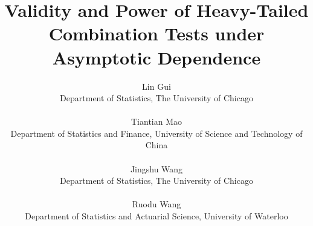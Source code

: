 \documentclass[12pt]{article}
\theoremstyle{plain}
\theoremstyle{plain}
\theoremstyle{definition}
\begin{document}
\def\spacingset#1{\renewcommand{\baselinestretch}%
{#1}\small\normalsize} \spacingset{1}


\title{\bf Validity and Power of Heavy-Tailed Combination Tests under Asymptotic Dependence}
\author{Lin Gui\vspace{-0.35cm}\\
    Department of Statistics, The University of Chicago \hspace{.2cm}\\
  \hspace{.2cm}\\ 
    Tiantian Mao\hspace{.2cm}\\
    Department of Statistics and Finance, University of Science and Technology of China \hspace{.2cm}\\
    \hspace{.2cm}\\ 
    Jingshu Wang\hspace{.2cm}\\
    Department of Statistics, The University of Chicago
   \hspace{.2cm}\\
    \hspace{.2cm}\\ 
    Ruodu Wang\hspace{.2cm}\\
    Department of Statistics and Actuarial Science,
University of Waterloo
    }
  
    \date{\vspace{-5ex}}
  \maketitle
\end{document}
